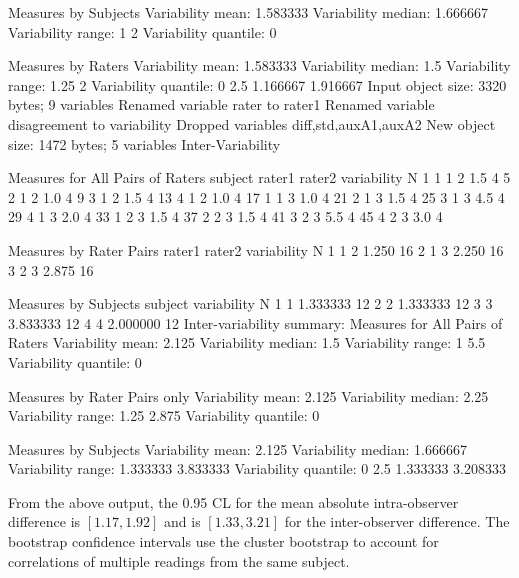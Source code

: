 \begin{Schunk}
\begin{Soutput}
Measures by Subjects
Variability mean:  1.583333 
Variability median:  1.666667 
Variability range:  1 2 
Variability quantile: 
0%:  1   25%:  1.5   50%:  1.666667   75%:  1.75   100%:  2 

Measures by Raters
Variability mean:  1.583333 
Variability median:  1.5 
Variability range:  1.25 2 
Variability quantile: 
0%:  1.25   25%:  1.375   50%:  1.5   75%:  1.75   100%:  2 
    2.5%    97.5% 
1.166667 1.916667 
Input object size:	 3320 bytes;	 9 variables
Renamed variable	 rater 	to rater1 
Renamed variable	 disagreement 	to variability 
Dropped variables	 diff,std,auxA1,auxA2 
New object size:	 1472 bytes;	 5 variables
Inter-Variability 

Measures for All Pairs of Raters
   subject rater1 rater2 variability N
1        1      1      2         1.5 4
5        2      1      2         1.0 4
9        3      1      2         1.5 4
13       4      1      2         1.0 4
17       1      1      3         1.0 4
21       2      1      3         1.5 4
25       3      1      3         4.5 4
29       4      1      3         2.0 4
33       1      2      3         1.5 4
37       2      2      3         1.5 4
41       3      2      3         5.5 4
45       4      2      3         3.0 4

Measures by Rater Pairs
  rater1 rater2 variability  N
1      1      2       1.250 16
2      1      3       2.250 16
3      2      3       2.875 16

Measures by Subjects
  subject variability  N
1       1    1.333333 12
2       2    1.333333 12
3       3    3.833333 12
4       4    2.000000 12
Inter-variability summary:
Measures for All Pairs of Raters
Variability mean:  2.125 
Variability median:  1.5 
Variability range:  1 5.5 
Variability quantile: 
0%:  1   25%:  1.375   50%:  1.5   75%:  2.25   100%:  5.5 

Measures by Rater Pairs only
Variability mean:  2.125 
Variability median:  2.25 
Variability range:  1.25 2.875 
Variability quantile: 
0%:  1.25   25%:  1.75   50%:  2.25   75%:  2.5625   100%:  2.875 

Measures by Subjects
Variability mean:  2.125 
Variability median:  1.666667 
Variability range:  1.333333 3.833333 
Variability quantile: 
0%:  1.333333   25%:  1.333333   50%:  1.666667   75%:  2.458333   100%:  3.833333 
    2.5%    97.5% 
1.333333 3.208333 
\end{Soutput}
\end{Schunk}
From the above output, the 0.95 CL for the mean absolute
intra-observer difference is $[1.17, 1.92]$ and is $[1.33, 3.21]$ for the
inter-observer difference.  The bootstrap confidence intervals use the
cluster bootstrap to account for correlations of multiple readings
from the same subject.

